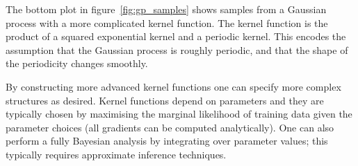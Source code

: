 \documentclass[preprint,authoryear,12pt]{elsarticle}
\begin{document}
The bottom plot in figure~\ref{fig:gp_samples} shows samples from a Gaussian process with a more complicated kernel function.
The kernel function is the product of a squared exponential kernel and a periodic kernel.
This encodes the assumption that the Gaussian process is roughly periodic, and that the shape of the periodicity changes smoothly.

By constructing more advanced kernel functions one can specify more complex structures as desired.
Kernel functions depend on parameters and they are typically chosen by maximising the marginal likelihood of training data given the parameter choices (all gradients can be computed analytically).
One can also perform a fully Bayesian analysis by integrating over parameter values; this typically requires approximate inference techniques.




\end{document}
